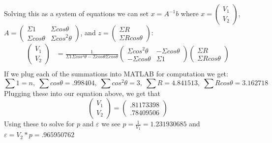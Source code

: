 \documentclass[11pt,a4paper]{article}
\begin{document}
\begin{itemize}
\begin{enumerate} [label={\alph*)}]
					Solving this as a system of equations we can set $x=A^{-1}b$ where $x=\begin{pmatrix} V_1 \\ V_2 \end{pmatrix}$, $A = \begin{pmatrix} \Sigma 1 & \Sigma cos\theta \\ \Sigma cos\theta & \Sigma cos^2\theta \end{pmatrix}$, and $z = \begin{pmatrix} \Sigma R \\ \Sigma Rcos\theta \end{pmatrix}$:
					\begin{align*}
						\begin{pmatrix} V_1 \\ V_2 \end{pmatrix} &= \frac{1}{\Sigma 1 \Sigma cos^2 \theta - \Sigma cos\theta \Sigma cos\theta} \begin{pmatrix} \Sigma cos^2 \theta & -\Sigma cos\theta \\ -\Sigma cos\theta & \Sigma 1 \end{pmatrix}\begin{pmatrix} \Sigma R \\ \Sigma Rcos\theta \end{pmatrix} \\
					\end{align*}
					If we plug each of the summations into MATLAB for computation we get:
					$$\displaystyle \sum 1 = n, \; \displaystyle \sum cos\theta = .998404, \; \displaystyle \sum cos^2\theta = 3, \; \displaystyle \sum R = 4.841513, \; \displaystyle \sum Rcos\theta = 3.162718$$
					Plugging these into our equation above, we get that
					$$\begin{pmatrix} V_1 \\ V_2 \end{pmatrix} = \begin{pmatrix} .81173398 \\ .78409506 \end{pmatrix}$$
					Using these to solve for $p$ and $\varepsilon$ we see $p = \frac{1}{V_1} = 1.231930685$ and $\varepsilon = V_2*p = .965950762$
					

\end{enumerate}
\end{itemize}
\end{document}
